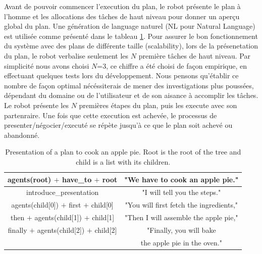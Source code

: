 \documentclass[a4paper,11pt,twoside]{StyleThese}
\begin{document}
Avant de pouvoir commencer l'execution du plan, le robot présente le plan à l'homme et les allocations des tâches de haut niveau pour donner un aperçu global du plan. Une génération de language naturel (NL pour Natural Language) est utilisée comme présenté dans le tableau \ref{table:pie-present}. 
Pour assurer le bon fonctionnement du système avec des plans de différente taille (scalability), lors de la présenetation du plan, le robot verbalise seulement les  $N$ première tâches de haut niveau. Par simplicité nous avons choisi $N$=$3$, ce chiffre a été choisi de façon empirique, en effectuant quelques tests lors du développement. Nous pensons qu'établir ce nombre de façon optimal nécéssiterais de mener des investigations plus poussées, dépendant du domaine ou de l'utilisateur et de son aisance à accomplir les tâches. Le robot présente les $N$ premières étapes du plan, puis les execute avec son partenraire. Une fois que cette execution est achevée, le processus de presenter/négocier/executé se répète jusqu'à ce que le plan soit achevé ou abandonné.


 
 
 \begin{table}
\centering
\scriptsize
\renewcommand{\arraystretch}{1.3}
\begin{tabular}{|c|c|}
\hline
   agents(root) $+$ have\_to $+$ root  & "We have to cook an apple pie." \\
   \hline
   introduce\_presentation & "I will tell you the steps." \\
   \hline
   agents(child[0]) $+$ first $+$ child[0] & "You will first fetch the ingredients," \\
   \hline
   then $+$ agents(child[1]) $+$  child[1] & "Then I will assemble the apple pie," \\
   \hline
   finally $+$ agents(child[2]) $+$  child[2] & "Finally, you will bake \\
   & the apple pie in the oven." \\
   \hline
\end{tabular}
 \vspace{-4pt}
\caption{Presentation of a plan to cook an apple pie. Root is the root of the tree and child is a list with its children.}
 \label{table:pie-present}    
\end{table}
 
\end{document}
